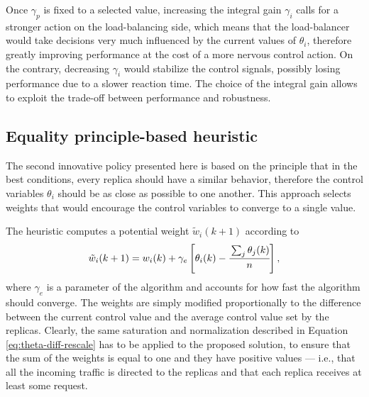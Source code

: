 Once $\gamma_p$ is fixed to a selected value, increasing the integral
gain $\gamma_i$ calls for a stronger action on the load-balancing
side, which means that the load-balancer would take decisions very
much influenced by the current values of $\theta_i$, therefore greatly
improving performance at the cost of a more nervous control action. On
the contrary, decreasing $\gamma_i$ would stabilize the control
signals, possibly losing performance due to a slower reaction
time. The choice of the integral gain allows to exploit the trade-off
between performance and robustness.

\subsection{Equality principle-based heuristic}

The second innovative policy presented here is based on the principle
that in the best conditions, every replica should have a similar
behavior, therefore the control variables $\theta_i$ should be as
close as possible to one another. This approach selects weights that
would encourage the control variables to converge to a single value.

The heuristic computes a potential weight $\tilde{w}_i(k+1)$ according
to
\begin{equation}
  \tilde{w}_i(k+1) = w_i(k) + \gamma_e 
\left[ \theta_i (k) - \cfrac{\sum_j \theta_j (k) }{n} \right] ,
\label{eq:equal-thetas}
\end{equation}
where $\gamma_e$ is a parameter of the algorithm and accounts for how
fast the algorithm should converge. The weights are simply modified
proportionally to the difference between the current control value and
the average control value set by the replicas. Clearly, the same
saturation and normalization described in Equation
\eqref{eq:theta-diff-rescale} has to be applied to the proposed
solution, to ensure that the sum of the weights is equal to one and
they have positive values --- i.e., that all the incoming traffic is
directed to the replicas and that each replica receives at least some
request.



